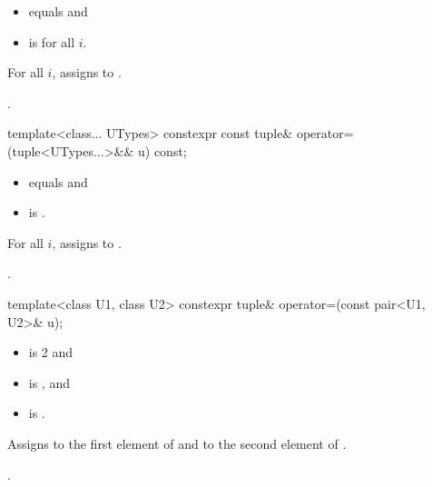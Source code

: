 \begin{itemdescr}
\pnum
\constraints
\begin{itemize}
\item {} equals  and
\item {} is  for all $i$.
\end{itemize}

\pnum
\effects
For all $i$, assigns  to
.

\pnum
\returns
{}.
\end{itemdescr}

%
\begin{itemdecl}
template<class... UTypes> constexpr const tuple& operator=(tuple<UTypes...>&& u) const;
\end{itemdecl}

\begin{itemdescr}
\pnum
\constraints
\begin{itemize}
\item
{} equals  and
\item
{} is .
\end{itemize}

\pnum
\effects
For all $i$,
assigns  to .

\pnum
\returns
{}.
\end{itemdescr}

%
%
\begin{itemdecl}
template<class U1, class U2> constexpr tuple& operator=(const pair<U1, U2>& u);
\end{itemdecl}

\begin{itemdescr}
\pnum
\constraints
\begin{itemize}
\item {} is 2 and
\item {} is , and
\item {} is .
\end{itemize}

\pnum
\effects
Assigns  to the first element of 
and  to the second element of .

\pnum
\returns
{}.
\end{itemdescr}

